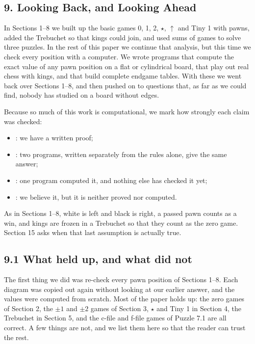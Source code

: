 \begin{center}
\section*{9. Looking Back, and Looking Ahead}
\end{center}

\indent \indent In Sections 1--8 we built up the basic games 0, 1, 2, $\star$, $\uparrow$ and Tiny 1 with pawns,
added the Trebuchet so that kings could join, and used sums of games to solve three puzzles. In the rest of this
paper we continue that analysis, but this time we check every position with a computer. We wrote programs that
compute the exact value of any pawn position on a flat or cylindrical board, that play out real chess with
kings, and that build complete endgame tables. With these we went back over Sections 1--8, and then pushed on
to questions that, as far as we could find, nobody has studied on a board without edges.

\indent Because so much of this work is computational, we mark how strongly each claim was checked:
\begin{itemize}
\item \proved: we have a written proof;
\item \checkedtwo: two programs, written separately from the rules alone, give the same answer;
\item \computedone: one program computed it, and nothing else has checked it yet;
\item \conjecture: we believe it, but it is neither proved nor computed.
\end{itemize}

\indent As in Sections 1--8, white is left and black is right, a passed pawn counts as a win, and kings are
frozen in a Trebuchet so that they count as the zero game. Section 15 asks when that last assumption is
actually true.

\subsection*{9.1 What held up, and what did not}

\indent The first thing we did was re-check every pawn position of Sections 1--8. Each diagram was copied out
again without looking at our earlier answer, and the values were computed from scratch. Most of the paper holds
up: the zero games of Section 2, the $\pm1$ and $\pm2$ games of Section 3, $\star$ and Tiny 1 in Section 4, the
Trebuchet in Section 5, and the c-file and f-file games of Puzzle 7.1 are all correct. A few things are not, and
we list them here so that the reader can trust the rest.

